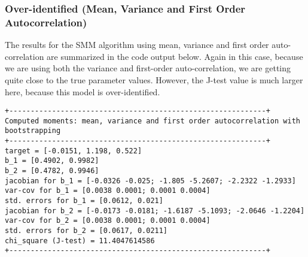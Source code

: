 \documentclass[12pt]{article}
\begin{document}
\subsubsection*{Over-identified (Mean, Variance and First Order Autocorrelation)}

The results for the SMM algorithm using mean, variance and first order auto-correlation are summarized in the code output below. Again in this case, because we are using both the variance and first-order auto-correlation, we are getting quite close to the true parameter values. However, the J-test value is much larger here, because this model is over-identified.

\begin{verbatim}
+------------------------------------------------------------+
Computed moments: mean, variance and first order autocorrelation with bootstrapping
+------------------------------------------------------------+
target = [-0.0151, 1.198, 0.522]
b_1 = [0.4902, 0.9982]
b_2 = [0.4782, 0.9946]
jacobian for b_1 = [-0.0326 -0.025; -1.805 -5.2607; -2.2322 -1.2933]
var-cov for b_1 = [0.0038 0.0001; 0.0001 0.0004]
std. errors for b_1 = [0.0612, 0.021]
jacobian for b_2 = [-0.0173 -0.0181; -1.6187 -5.1093; -2.0646 -1.2204]
var-cov for b_2 = [0.0038 0.0001; 0.0001 0.0004]
std. errors for b_2 = [0.0617, 0.0211]
chi_square (J-test) = 11.4047614586
+------------------------------------------------------------+
\end{verbatim}
\end{document}
